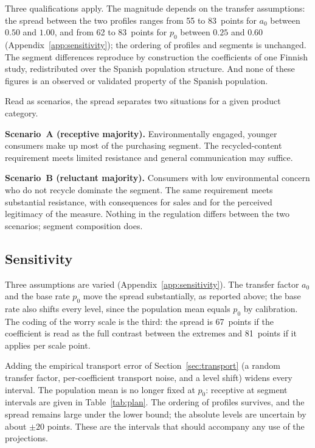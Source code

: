 Three qualifications apply. The magnitude depends on the transfer assumptions:
the spread between the two profiles ranges from 55 to 83~points for $a_0$
between $0.50$ and $1.00$, and from 62 to 83~points for $p_0$ between $0.25$
and $0.60$ (Appendix~\ref{app:sensitivity}); the ordering of profiles and
segments is unchanged. The segment differences reproduce by construction the
coefficients of one Finnish study, redistributed over the Spanish population
structure. And none of these figures is an observed or validated property of
the Spanish population.

Read as scenarios, the spread separates two situations for a given product
category.

\textbf{Scenario~A (receptive majority).} Environmentally engaged, younger
consumers make up most of the purchasing segment. The recycled-content
requirement meets limited resistance and general communication may suffice.

\textbf{Scenario~B (reluctant majority).} Consumers with low environmental
concern who do not recycle dominate the segment. The same requirement meets
substantial resistance, with consequences for sales and for the perceived
legitimacy of the measure. Nothing in the regulation differs between the two
scenarios; segment composition does.

\subsection{Sensitivity}
\label{sec:sensitivity}

Three assumptions are varied (Appendix~\ref{app:sensitivity}). The transfer
factor $a_0$ and the base rate $p_0$ move the spread substantially, as reported
above; the base rate also shifts every level, since the population mean equals
$p_0$ by calibration. The coding of the worry scale is the third: the spread
is 67~points if the coefficient is read as the full contrast between the
extremes and 81~points if it applies per scale point.

Adding the empirical transport error of Section~\ref{sec:transport} (a
random transfer factor, per-coefficient transport noise, and a level shift)
widens every interval. The population mean is no longer fixed at $p_0$:
receptive at %
segment intervals are given in Table~\ref{tab:plan}. The ordering of profiles survives, and the spread
remains large under the lower bound; the absolute levels are uncertain by
about $\pm 20$ points. These are the intervals that should accompany any use
of the projections.

